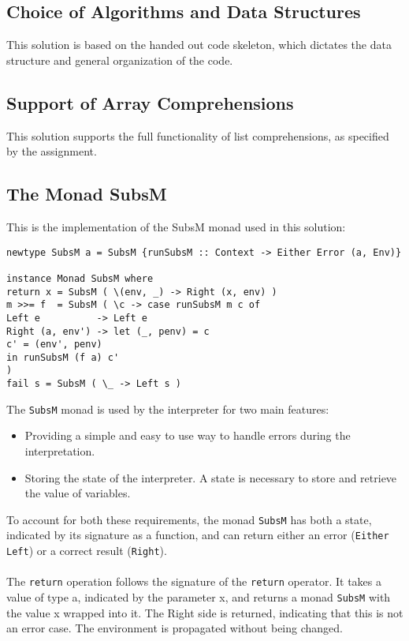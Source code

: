 \documentclass[11pt, a4paper]{article}
\begin{document}
\subsection{Choice of Algorithms and Data Structures}
This solution is based on the handed out code skeleton, which dictates the data structure and general organization of the code.


\subsection{Support of Array Comprehensions}
This solution supports the full functionality of list comprehensions, as specified by the assignment.

\subsection{The Monad SubsM}

This is the implementation of the SubsM monad used in this solution:
\begin{lstlisting}[language={[Modern]Haskell}]
newtype SubsM a = SubsM {runSubsM :: Context -> Either Error (a, Env)}

instance Monad SubsM where
return x = SubsM ( \(env, _) -> Right (x, env) )
m >>= f  = SubsM ( \c -> case runSubsM m c of
Left e          -> Left e
Right (a, env') -> let (_, penv) = c
c' = (env', penv)
in runSubsM (f a) c'
)
fail s = SubsM ( \_ -> Left s )
\end{lstlisting}

The \texttt{SubsM} monad is used by the interpreter for two main features:
\begin{itemize}
	\item Providing a simple and easy to use way to handle errors during the interpretation. 
	\item Storing the state of the interpreter. A state is necessary to store and retrieve the value of variables. 
\end{itemize}

To account for both these requirements, the monad \texttt{SubsM} has both a state, indicated by its signature as a function, and can return either an error (\texttt{Either Left}) or a correct result (\texttt{Right}).

\paragraph{}
The \texttt{return} operation follows the signature of the \texttt{return} operator. It takes a value of type a, indicated by the parameter x, and returns a monad \texttt{SubsM} with the value x wrapped into it. The Right side is returned, indicating that this is not an error case. The environment is propagated without being changed.
\end{document}
